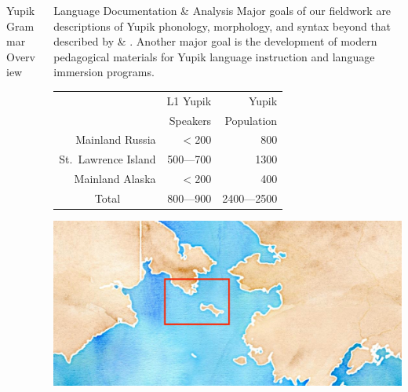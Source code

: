 \documentclass[usenames,dvipsnames]{beamer}
\begin{document}
\begin{frame}[fragile]
\begin{columns}[T]
\begin{column}{0.3\textwidth}
\begin{block}{Yupik Grammar Overview}
\begin{itemize}
    \vspace{18pt}
\end{itemize}
\vspace*{9mm}
\end{block}
\end{column}

\begin{column}{0.3\textwidth}
\begin{block}{Language Documentation \& Analysis}
%
Major goals of our fieldwork are descriptions of Yupik phonology, morphology, and syntax beyond that described by \citet{Krauss:1975} \& \citet{Jacobson:2001}.
%
Another major goal is the development of modern pedagogical materials for Yupik language instruction and language immersion programs.

\end{block}

%
\begin{minipage}{0.49\textwidth}
\hspace*{-7mm}
\renewcommand{\arraystretch}{0.75}
\begin{tabular}{r|r|r|}
\cline{2-3}
 & \scriptsize L1 Yupik & \scriptsize Yupik \\ 
 & \scriptsize Speakers & \scriptsize Population \\ \hline
\multicolumn{}{|r|}{\scriptsize Mainland Russia}  &  \scriptsize $<$200 & \scriptsize 800      \\
\multicolumn{}{|r|}{\scriptsize St.~Lawrence Island} & \scriptsize 500---700 & \scriptsize 1300      \\
\multicolumn{}{|r|}{\scriptsize Mainland Alaska}    & \scriptsize  $<$200 & \scriptsize  400      \\
\hline
\hline
\multicolumn{}{|c|}{\scriptsize Total} & \scriptsize 800---900 & \scriptsize 2400---2500 \\ \hline
\end{tabular}
\end{minipage}
%
\begin{minipage}{0.49\textwidth}
\hspace*{8.5mm}\includegraphics[scale=0.34]{map-box.jpg}
\end{minipage}%
\vspace{18pt}


\end{column}
\end{columns}
\end{frame}
\end{document}
